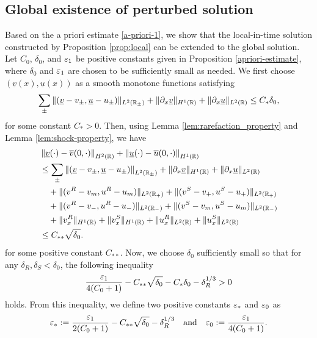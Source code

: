 \documentclass[11pt,reqno]{amsart}
\begin{document}
\subsection{Global existence of perturbed solution} \label{Global existence}
Based on the a priori estimate \eqref{a-priori-1}, we show that the local-in-time solution constructed by Proposition \ref{prop:local} can be extended to the global solution. Let $C_0$, $\delta_0$, and $\varepsilon_1$ be positive constants given in Proposition \ref{apriori-estimate}, where $\delta_0$ and $\varepsilon_1$ are chosen to be sufficiently small as needed. We first choose $(\underline{v}(x),\underline{u}(x))$ as a smooth monotone functions satisfying
    \begin{equation}\label{ubarvbar}
        \sum_{\pm}\|(\underline{v}-v_\pm,\underline{u}-u_\pm)\|_{L^2(\mathbb{R}_\pm)}+\|\partial_x\underline{v}\|_{H^1(\mathbb{R})}+\|\partial_x\underline{u}\|_{L^2(\mathbb{R})}\le C_* \delta_0 ,
        \end{equation}
        for some constant $C_*>0$. Then, using Lemma \ref{lem:rarefaction_property} and Lemma \ref{lem:shock-property}, we have
	\begin{equation}
	\begin{aligned}\label{est-init}
	&\left\lVert\underline{v}(\cdot)-\overline{v}(0,\cdot)\right\rVert_{H^2(\mathbb{R})}+\left\lVert\underline{u}(\cdot)-\overline{u}(0,\cdot)\right\rVert_{H^1(\mathbb{R})}\\
	&\le \sum_{\pm}\left\lVert(\underline{v}-v_{\pm},\underline{u}-u_{\pm})\right\rVert_{L^2(\mathbb{R}_\pm)} +\|\partial_x \underline{v}\|_{H^1(\mathbb{R})} + \|\partial_x \underline{u}\|_{L^2(\mathbb{R})}\\
 &\quad +\|(v^R-v_m,u^R-u_m)\|_{L^2(\mathbb{R}_+)}+ \|(v^S-v_+,u^S-u_+)\|_{L^2(\mathbb{R}_+)} \\
 &\quad +\|(v^R-v_-,u^R-u_-)\|_{L^2(\mathbb{R}_-)} +\|(v^S-v_m,u^S-u_m)\|_{L^2(\mathbb{R}_-)}  \\ 
 &\quad  + \|v^R_x\|_{H^1(\mathbb{R})} + \|v^S_x\|_{H^1(\mathbb{R})} 
 + \|u^R_x\|_{L^2(\mathbb{R})} + \|u^S_x\|_{L^2(\mathbb{R})} \\ 
	&\le C_{**} \sqrt{\delta_0}.
	\end{aligned}
	\end{equation}
for some positive constant $C_{**}$. Now, we choose $\delta_0$ sufficiently small so that for any $\delta_R,\delta_S < \delta_0$, the following inequality \[ \frac{\varepsilon_1}{4(C_0+1)}-C_{**} \sqrt{\delta_0} - C_* \delta_0 -\delta_R^{1/3}>0\] holds. From this inequality, we define two positive constants $\varepsilon_*$ and $\varepsilon_0$ as
\[\varepsilon_*:=\frac{\varepsilon_1}{2(C_0+1)}- C_{**} \sqrt{\delta_0} -\delta_R^{1/3} \quad \text{and} \quad \varepsilon_0:=\frac{\varepsilon_1}{4(C_0+1)}.\]
\end{document}
